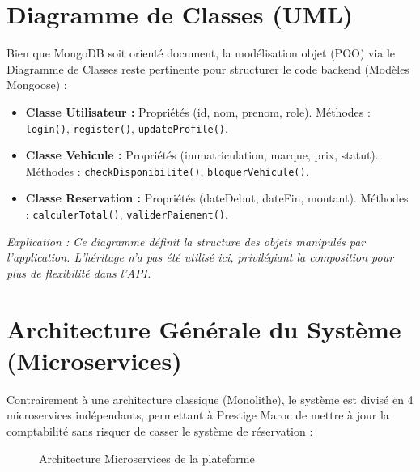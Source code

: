 \section{Diagramme de Classes (UML)}
Bien que MongoDB soit orienté document, la modélisation objet (POO) via le Diagramme de Classes reste pertinente pour structurer le code backend (Modèles Mongoose) :
\begin{itemize}
    \item \textbf{Classe Utilisateur :} Propriétés (id, nom, prenom, role). Méthodes : \texttt{login()}, \texttt{register()}, \texttt{updateProfile()}.
    \item \textbf{Classe Vehicule :} Propriétés (immatriculation, marque, prix, statut). Méthodes : \texttt{checkDisponibilite()}, \texttt{bloquerVehicule()}.
    \item \textbf{Classe Reservation :} Propriétés (dateDebut, dateFin, montant). Méthodes : \texttt{calculerTotal()}, \texttt{validerPaiement()}.
\end{itemize}
\textit{Explication : Ce diagramme définit la structure des objets manipulés par l'application. L'héritage n'a pas été utilisé ici, privilégiant la composition pour plus de flexibilité dans l'API.}

\section{Architecture Générale du Système (Microservices)}

Contrairement à une architecture classique (Monolithe), le système est divisé en 4 microservices indépendants, permettant à Prestige Maroc de mettre à jour la comptabilité sans risquer de casser le système de réservation :

\begin{figure}[H]
    \centering
    \caption{Architecture Microservices de la plateforme}
\end{figure}

